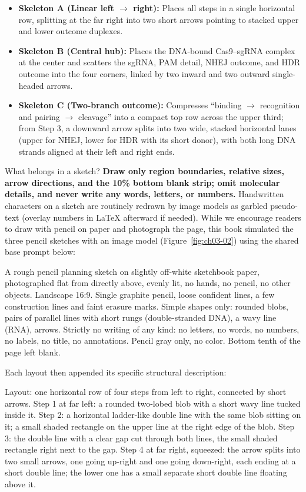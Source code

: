 \begin{itemize}
\item \textbf{Skeleton A (Linear left $\rightarrow$ right):} Places all steps in a single horizontal row, splitting at the far right into two short arrows pointing to stacked upper and lower outcome duplexes.
\item \textbf{Skeleton B (Central hub):} Places the DNA-bound Cas9--sgRNA complex at the center and scatters the sgRNA, PAM detail, NHEJ outcome, and HDR outcome into the four corners, linked by two inward and two outward single-headed arrows.
\item \textbf{Skeleton C (Two-branch outcome):} Compresses ``binding $\rightarrow$ recognition and pairing $\rightarrow$ cleavage'' into a compact top row across the upper third; from Step 3, a downward arrow splits into two wide, stacked horizontal lanes (upper for NHEJ, lower for HDR with its short donor), with both long DNA strands aligned at their left and right ends.
\end{itemize}

What belongs in a sketch? \textbf{Draw only region boundaries, relative sizes, arrow directions, and the 10\% bottom blank strip; omit molecular details, and never write any words, letters, or numbers.} Handwritten characters on a sketch are routinely redrawn by image models as garbled pseudo-text (overlay numbers in LaTeX afterward if needed). While we encourage readers to draw with pencil on paper and photograph the page, this book simulated the three pencil sketches with an image model (Figure~\ref{fig:ch03-02}) using the shared base prompt below:

\begin{Prompt}
A rough pencil planning sketch on slightly off-white sketchbook paper, photographed flat from directly above, evenly lit, no hands, no pencil, no other objects. Landscape 16:9. Single graphite pencil, loose confident lines, a few construction lines and faint erasure marks. Simple shapes only: rounded blobs, pairs of parallel lines with short rungs (double-stranded DNA), a wavy line (RNA), arrows. Strictly no writing of any kind: no letters, no words, no numbers, no labels, no title, no annotations. Pencil gray only, no color. Bottom tenth of the page left blank.
\end{Prompt}

Each layout then appended its specific structural description:

\begin{Prompt}
[A - Linear] Layout: one horizontal row of four steps from left to right, connected by short arrows. Step 1 at far left: a rounded two-lobed blob with a short wavy line tucked inside it. Step 2: a horizontal ladder-like double line with the same blob sitting on it; a small shaded rectangle on the upper line at the right edge of the blob. Step 3: the double line with a clear gap cut through both lines, the small shaded rectangle right next to the gap. Step 4 at far right, squeezed: the arrow splits into two small arrows, one going up-right and one going down-right, each ending at a short double line; the lower one has a small separate short double line floating above it.
\end{Prompt}


